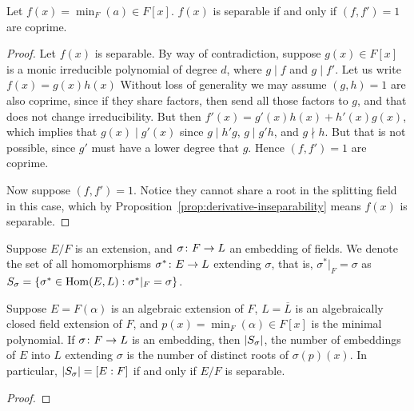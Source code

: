 \begin{lemma}
    Let \(f(x) = \min_F(a) \in F[x]\).
    \(f(x)\) is separable if and only if \((f,f') = 1\) are coprime.
\end{lemma}
\begin{proof}
    Let \(f(x)\) is separable.
    By way of contradiction,
    suppose \(g(x) \in F[x]\) is a monic irreducible polynomial of degree \(d\),
    where \(g \mid f\) and \(g \mid f'\).
    Let us write \(f(x) = g(x)h(x)\)
    Without loss of generality we may assume \((g,h) = 1\) are also coprime,
    since if they share factors, then send all those factors to \(g\),
    and that does not change irreducibility.
    But then \(f'(x) = g'(x)h(x) + h'(x)g(x)\),
    which implies that \(g(x) \mid g'(x)\)
    since \(g \mid h'g\), \(g \mid g'h\), and \(g \nmid h\).
    But that is not possible, since \(g'\) must have a lower degree that \(g\).
    Hence \((f,f') = 1\) are coprime.

    Now suppose \((f,f') = 1\).
    Notice they cannot share a root in the splitting field in this case,
    which by Proposition~\ref{prop:derivative-inseparability}
    means \(f(x)\) is separable.
\end{proof}

\begin{definition}
    Suppose \(E/F\) is an extension,
    and \(\sigma\colon F\to L\) an embedding of fields.
    We denote the set of all homomorphisms \(\sigma^\ast\colon E\to L\)
    extending \(\sigma\), that is, \(\sigma^\ast\vert_F = \sigma\) as
    \(S_\sigma = \{\sigma^\ast\in\operatorname{Hom}(E,L) : \sigma^\ast\vert_F = \sigma\}\).
\end{definition}
\begin{theorem}
    Suppose \(E = F(\alpha)\) is an algebraic extension of \(F\),
    \(L = \overline{L}\) is an algebraically closed field extension of \(F\),
    and \(p(x) = \min_F(\alpha) \in F[x]\) is the minimal polynomial.
    If \(\sigma\colon F\to L\) is an embedding,
    then \(\abs{S_\sigma}\),
    the number of embeddings of \(E\) into \(L\) extending \(\sigma\)
    is the number of distinct roots of \(\sigma(p)(x)\).
    In particular, \(\abs{S_\sigma} = [E:F]\)
    if and only if \(E/F\) is separable.
\end{theorem}
\begin{proof}
\end{proof}

